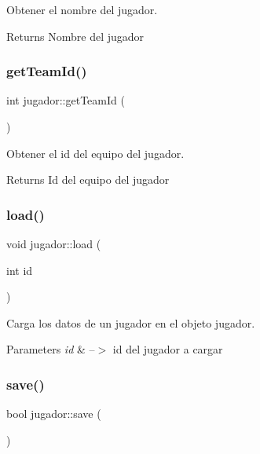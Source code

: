 Obtener el nombre del jugador. 

\begin{DoxyReturn}{Returns}
Nombre del jugador 
\end{DoxyReturn}
\mbox{\label{classjugador_a188b5459eed3f7f09b49232d0d674050}} 
\subsubsection{\texorpdfstring{get\+Team\+Id()}{getTeamId()}}
{\footnotesize\ttfamily int jugador\+::get\+Team\+Id (\begin{DoxyParamCaption}{ }\end{DoxyParamCaption})}



Obtener el id del equipo del jugador. 

\begin{DoxyReturn}{Returns}
Id del equipo del jugador 
\end{DoxyReturn}
\mbox{\label{classjugador_a9b57bb55fbd19cf2a1fee8397eeb0135}} 
\subsubsection{\texorpdfstring{load()}{load()}}
{\footnotesize\ttfamily void jugador\+::load (\begin{DoxyParamCaption}\item[{int}]{id }\end{DoxyParamCaption})}



Carga los datos de un jugador en el objeto jugador. 


\begin{DoxyParams}{Parameters}
{\em id} & --$>$ id del jugador a cargar \\
\hline
\end{DoxyParams}
\mbox{\label{classjugador_af56aa410ca759cb4e3548af92de007b0}} 
\subsubsection{\texorpdfstring{save()}{save()}}
{\footnotesize\ttfamily bool jugador\+::save (\begin{DoxyParamCaption}{ }\end{DoxyParamCaption})}



